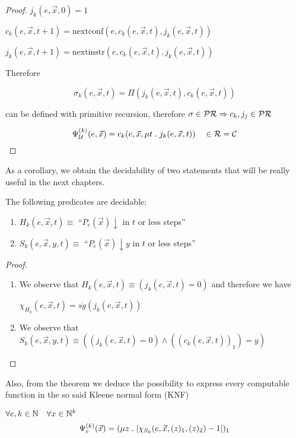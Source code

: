 \begin{theorem}
\begin{proof}
  $j_k(e, \vec{x}, 0) = 1$

  $c_k(e, \vec{x}, t+1) = \mbox{nextconf} (e, c_k(e, \vec{x}, t), j_k(e,\vec{x},t))$

  $j_k(e, \vec{x}, t+1) = \mbox{nextinstr} (e, c_k(e, \vec{x}, t), j_k(e,\vec{x},t))$

  Therefore

  \[
    \sigma_k(e,\vec{x},t) = \Pi(j_k(e,\vec{x},t), c_k(e,\vec{x},t))
  \]

  can be defined with primitive recursion, therefore $\sigma \in \mathcal{PR} \Rightarrow c_k, j_j \in \mathcal{PR}$

  \[
    \Psi_{\mathcal{U}}^{(k)} (e, \vec{x}) = c_k(e, \vec{x}, \mu t \; . \; j_k(e,\vec{x},t)) \quad \in \mathcal{R} = \mathcal{C}
  \]
  \end{proof}
\end{theorem}

As a corollary, we obtain the decidability of two statements that will
be really useful in the next chapters.

\begin{corollary}
  The following predicates are decidable:
  \begin{enumerate}[label=(\alph*)]
  \item $H_k(e, \vec{x}, t) \equiv$ ``$P_e(\vec{x})\downarrow$ in $t$
    or less steps''
  \item $S_k(e, \vec{x}, y, t) \equiv$ ``$P_e(\vec{x})\downarrow y$ in
    $t$ or less steps''
  \end{enumerate}
  \begin{proof}
    \begin{enumerate}[label=(\alph*)]
    \item We observe that
      $H_k(e, \vec{x}, t) \equiv (j_k(e,\vec{x}, t) = 0)$ and therefore
      we have
      
      $\chi_{H_k}(e, \vec{x}, t) = \overline{sg}(j_k(e,\vec{x},t))$
    \item We observe that
      $S_k(e, \vec{x}, y, t) \equiv ((j_k(e,\vec{x},t) = 0) \wedge ((c_k(e,\vec{x},t))_1)=y)$
    \end{enumerate}
  \end{proof}
\end{corollary}

Also, from the theorem we deduce the possibility to express every
computable function in the so said Kleene normal form (KNF)

\begin{corollary}
  $\forall e,k \in \mathbb{N} \quad \forall x \in \mathbb{N}^k$
  \[
    \Psi_e^{(k)} (\vec{x}) = (\mu z \;.\; |\chi_{S_k}(e, \vec{x}, (z)_1, (z)_2) - 1|)_1
  \]
\end{corollary}

